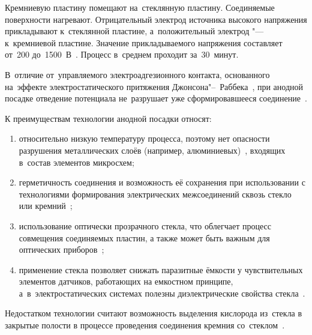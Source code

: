 Кремниевую пластину помещают на~стеклянную пластину. Соединяемые
поверхности нагревают. Отрицательный электрод источника высокого напряжения
 прикладывают к~стеклянной пластине, а~положительный электрод "---
к~кремниевой пластине. Значение прикладываемого напряжения составляет от~200
до~1500~В~\cites[484]{lit_madou2002fundamentals}{Khomenko1982useglassproperties, Khomenko1990physprocess}. Процесс в~среднем проходит за~30~минут.

В~отличие от~управляемого электроадгезионного контакта, основанного на~эффекте электростатического притяжения Джонсона"--~Раббека~\cite{johnsen1923physical,atkinson1969simple}, при анодной посадке отведение потенциала не~разрушает уже сформировавшееся соединение~\cite{evdokimov1968issledovanie_avtoref}.

К преимуществам технологии анодной посадки относят:
\begin{enumerate}
    \renewcommand{\labelenumi}{\asbuk{enumi})}
    \item относительно низкую температуру процесса, поэтому нет опасности разрушения
    металлических слоёв (например, алюминиевых)~\cite{Low_temp_wafer_AB}, входящих
    в~состав элементов микросхем;
    \item герметичность соединения и возможность её сохранения при использовании с
    технологиями формирования электрических межсоединений сквозь стекло или
    кремний~\cite{lee_rogers2011ssi_design_rules_wlp};
    \item использование оптически прозрачного стекла, что облегчает процесс
    совмещения соединяемых пластин, а также может быть важным для оптических
    приборов~\cite{shoji1998low_b_quartz};
    \item применение стекла позволяет снижать паразитные ёмкости у чувствительных
    элементов датчиков, работающих на емкостном принципе, а~в~электростатических
    системах полезны диэлектрические свойства стекла~\cite{shoji1998low_b_quartz}.
\end{enumerate}

Недостатком технологии считают возможность выделения кислорода из~стекла
в закрытые полости в процессе проведения соединения кремния
со~стеклом~\cites{lit_Esashi_Wafer2008,lee_rogers2011ssi_design_rules_wlp}[С.~3-20]{gad2006mems_applications}{barinov2015_datchik_zhestk,Rogers1992considerations,timoshenkov2010metody}.

